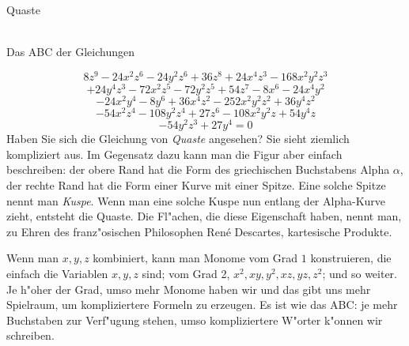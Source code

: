 \documentclass[de]{./../../common/SurferDesc}%
\begin{document}
\footnotesize





\begin{surferPage}
  \begin{surferTitle}Quaste\end{surferTitle} \\
Das ABC der Gleichungen

  \smallskip
\[8z^9-24x^2z^6-24y^2z^6+36z^8+24x^4z^3-168x^2y^2z^3\]
\[+24y^4z^3-72x^2z^5-72y^2z^5+54z^7-8x^6-24x^4y^2\]
\[-24x^2y^4-8y^6 + 36x^4z^2-252x^2y^2z^2+36y^4z^2\]
\[- 54x^2z^4-108y^2z^4 + 27z^6-108x^2y^2z + 54y^4z\]
\[-54y^2z^3 + 27y^4 = 0\]
\singlespacing
Haben Sie sich die Gleichung von {\it Quaste} angesehen? Sie sieht ziemlich kompliziert aus. Im Gegensatz dazu kann man die Figur aber einfach beschreiben: der obere Rand hat die Form des griechischen Buchstabens Alpha $\alpha$, der rechte Rand hat die Form einer Kurve mit einer Spitze. Eine solche Spitze nennt man {\it Kuspe}. Wenn man eine solche Kuspe nun entlang der Alpha-Kurve zieht, entsteht die Quaste. Die Fl"achen, die diese Eigenschaft haben, nennt man, zu Ehren des franz"osischen Philosophen Ren\'e Descartes, kartesische Produkte.

Wenn man $x,y, z$ kombiniert, kann man Monome vom Grad $1$ konstruieren, die einfach die Variablen $x,y, z $ sind; vom Grad 2,  $x^2, xy, y^2, xz, yz, z^2$; und so weiter. Je h"oher der Grad, umso mehr Monome haben wir und das gibt uns mehr Spielraum, um kompliziertere Formeln zu erzeugen. Es ist wie das ABC: je mehr Buchstaben zur Verf"ugung stehen, umso kompliziertere W"orter k"onnen wir schreiben.



  \begin{surferText}
     \end{surferText}
\end{surferPage}
\end{document}
